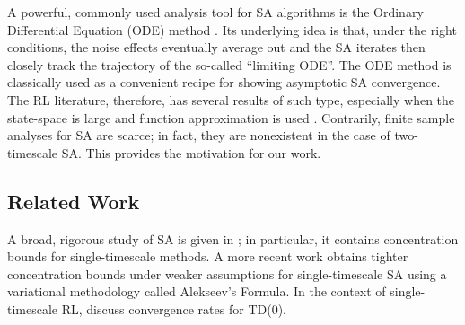 \documentclass[usenames,dvipsnames,final,12pt]{colt2018} %
\newcommand{\red}[1]{\textcolor{red}{\textsf{#1}}}
\newcommand{\gal}[1]{#1}
\newcommand{\gugan}[1]{#1}
\begin{document}
\gal{A powerful, commonly used} analysis tool for SA algorithms \gal{is} the Ordinary Differential Equation (ODE) method \citep{borkar2000ode}. \gal{Its underlying idea} is that, under the right conditions, \gugan{the} noise effects \gugan{eventually} average out and the SA iterates \gugan{then} closely track the trajectory of the so-called ``limiting ODE''. \gal{The ODE method is classically used as} a convenient recipe for showing \gal{asymptotic SA} convergence. \gugan{The RL literature, therefore, has several results of such type,} especially when the state-space is large and function approximation is used \citep{sutton2009convergent,sutton2009fast,sutton2015emphatic,bhatnagar2009natural}. \gal{Contrarily, f}inite sample analyses for SA are scarce; in fact, they are nonexistent in the case of two-timescale SA. This \gal{provides} the motivation for our work.

\subsection{Related Work}\label{sec:related_rl_work}



A broad, rigorous study of SA is given in \citep{borkar2008stochastic}; in particular, it contains concentration bounds for single-timescale methods. A more recent work \citep{thoppe2015concentration} obtains tighter concentration bounds under weaker assumptions for single-timescale SA using a variational methodology called Alekseev's Formula. In the context of \gal{single-timescale RL}, \cite{kondathesis, korda2015td, dalal2018finite} discuss convergence rate\gal{s} for TD(0).
\end{document}
